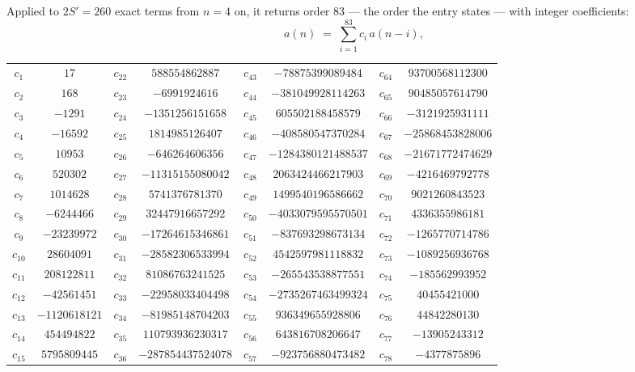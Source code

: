 \documentclass[11pt,a4paper]{article}
\theoremstyle{plain}
\theoremstyle{definition}
\begin{document}
Applied to $2S'=260$ exact terms from $n=4$ on, it returns order $83$ --- the
order the entry states --- with integer coefficients:
\[
a(n)\;=\;\sum_{i=1}^{83}c_i\,a(n-i),
\]
\begin{center}\small
\begin{tabular}{cccccccc}
$c_{1}$ & $17$ & $c_{22}$ & $588554862887$ & $c_{43}$ & $-78875399089484$ & $c_{64}$ & $93700568112300$ \\
$c_{2}$ & $168$ & $c_{23}$ & $-6991924616$ & $c_{44}$ & $-381049928114263$ & $c_{65}$ & $90485057614790$ \\
$c_{3}$ & $-1291$ & $c_{24}$ & $-1351256151658$ & $c_{45}$ & $605502188458579$ & $c_{66}$ & $-3121925931111$ \\
$c_{4}$ & $-16592$ & $c_{25}$ & $1814985126407$ & $c_{46}$ & $-408580547370284$ & $c_{67}$ & $-25868453828006$ \\
$c_{5}$ & $10953$ & $c_{26}$ & $-646264606356$ & $c_{47}$ & $-1284380121488537$ & $c_{68}$ & $-21671772474629$ \\
$c_{6}$ & $520302$ & $c_{27}$ & $-11315155080042$ & $c_{48}$ & $2063424466217903$ & $c_{69}$ & $-4216469792778$ \\
$c_{7}$ & $1014628$ & $c_{28}$ & $5741376781370$ & $c_{49}$ & $1499540196586662$ & $c_{70}$ & $9021260843523$ \\
$c_{8}$ & $-6244466$ & $c_{29}$ & $32447916657292$ & $c_{50}$ & $-4033079595570501$ & $c_{71}$ & $4336355986181$ \\
$c_{9}$ & $-23239972$ & $c_{30}$ & $-17264615346861$ & $c_{51}$ & $-837693298673134$ & $c_{72}$ & $-1265770714786$ \\
$c_{10}$ & $28604091$ & $c_{31}$ & $-28582306533994$ & $c_{52}$ & $4542597981118832$ & $c_{73}$ & $-1089256936768$ \\
$c_{11}$ & $208122811$ & $c_{32}$ & $81086763241525$ & $c_{53}$ & $-265543538877551$ & $c_{74}$ & $-185562993952$ \\
$c_{12}$ & $-42561451$ & $c_{33}$ & $-22958033404498$ & $c_{54}$ & $-2735267463499324$ & $c_{75}$ & $40455421000$ \\
$c_{13}$ & $-1120618121$ & $c_{34}$ & $-81985148704203$ & $c_{55}$ & $936349655928806$ & $c_{76}$ & $44842280130$ \\
$c_{14}$ & $454494822$ & $c_{35}$ & $110793936230317$ & $c_{56}$ & $643816708206647$ & $c_{77}$ & $-13905243312$ \\
$c_{15}$ & $5795809445$ & $c_{36}$ & $-287854437524078$ & $c_{57}$ & $-923756880473482$ & $c_{78}$ & $-4377875896$ \\

\end{tabular}
\end{center}
\end{document}
